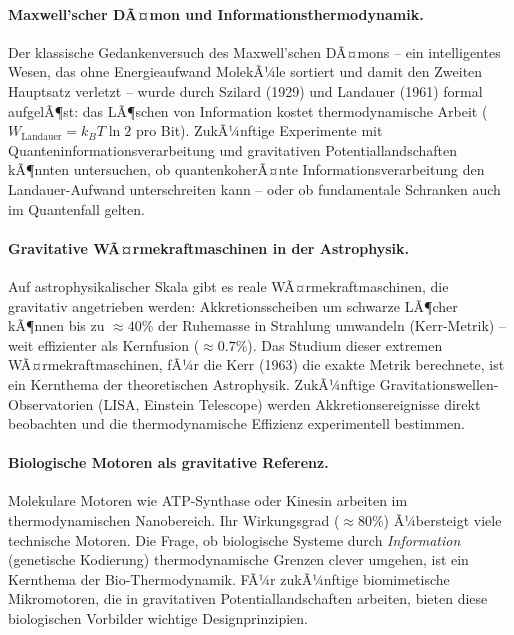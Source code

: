 ﻿\documentclass[12pt, a4paper]{report}
\theoremstyle{definition}
\theoremstyle{remark}
\begin{document}
\paragraph{Maxwell'scher DÃ¤mon und Informationsthermodynamik.}
Der klassische Gedankenversuch des Maxwell'schen DÃ¤mons -- ein intelligentes
Wesen, das ohne Energieaufwand MolekÃ¼le sortiert und damit den Zweiten Hauptsatz
verletzt -- wurde durch Szilard (1929) und Landauer (1961) formal aufgelÃ¶st:
das LÃ¶schen von Information kostet thermodynamische Arbeit
($W_{\text{Landauer}} = k_B T \ln 2$ pro Bit). ZukÃ¼nftige Experimente mit
Quanteninformationsverarbeitung und gravitativen Potentiallandschaften kÃ¶nnten
untersuchen, ob quantenkoherÃ¤nte Informationsverarbeitung den Landauer-Aufwand
unterschreiten kann -- oder ob fundamentale Schranken auch im Quantenfall gelten.

\paragraph{Gravitative WÃ¤rmekraftmaschinen in der Astrophysik.}
Auf astrophysikalischer Skala gibt es reale WÃ¤rmekraftmaschinen, die gravitativ
angetrieben werden: Akkretionsscheiben um schwarze LÃ¶cher kÃ¶nnen bis zu
$\approx 40\%$ der Ruhemasse in Strahlung umwandeln (Kerr-Metrik) -- weit
effizienter als Kernfusion ($\approx 0.7\%$). Das Studium dieser extremen
WÃ¤rmekraftmaschinen, fÃ¼r die Kerr (1963) die exakte Metrik berechnete, ist ein
Kernthema der theoretischen Astrophysik. ZukÃ¼nftige Gravitationswellen-Observatorien
(LISA, Einstein Telescope) werden Akkretionsereignisse direkt beobachten und
die thermodynamische Effizienz experimentell bestimmen.

\paragraph{Biologische Motoren als gravitative Referenz.}
Molekulare Motoren wie ATP-Synthase oder Kinesin arbeiten im thermodynamischen
Nanobereich. Ihr Wirkungsgrad ($\approx 80\%$) Ã¼bersteigt viele technische
Motoren. Die Frage, ob biologische Systeme durch \emph{Information} (genetische
Kodierung) thermodynamische Grenzen clever umgehen, ist ein Kernthema der
Bio-Thermodynamik. FÃ¼r zukÃ¼nftige biomimetische Mikromotoren, die in gravitativen
Potentiallandschaften arbeiten, bieten diese biologischen Vorbilder wichtige
Designprinzipien.

\end{document}
